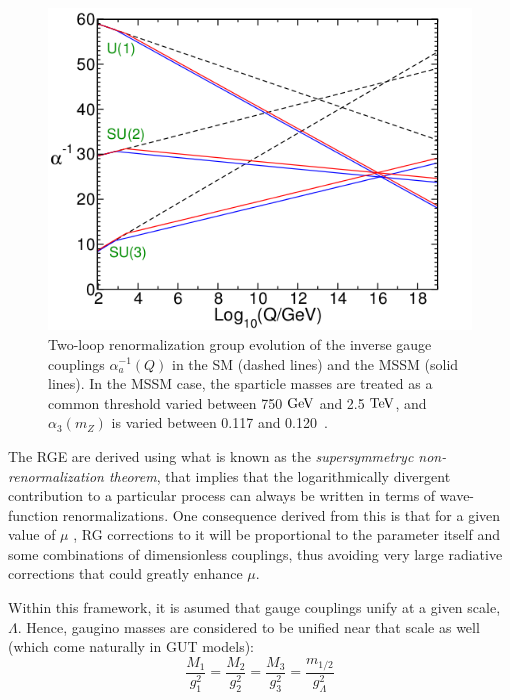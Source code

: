 \begin{figure}[htb!]
\begin{center}
\includegraphics[scale=0.6]{figs/RGE.png}
\end{center}
\caption{Two-loop renormalization group evolution of the inverse gauge couplings $\alpha_a^{-1}(Q)$ in the SM (dashed lines) and the MSSM (solid lines). In the MSSM case, the sparticle masses are treated as a common threshold varied between 750 $\rm GeV$ and 2.5 $\rm TeV$, and $\alpha_3(m_Z)$ is varied between 0.117 and 0.120~\cite{Martin:1997ns}.}
\label{fig:RGE}
\end{figure}

The RGE are derived using what is known as the \textit{supersymmetryc non-renormalization theorem}, that implies that the logarithmically divergent contribution to a particular process can always be written in terms of wave-function renormalizations. One consequence derived from this is that for a given value of $\mu$ , RG corrections to it will be proportional to the parameter itself and some combinations of dimensionless couplings, thus avoiding very large radiative corrections that could greatly enhance $\mu$. 

Within this framework, it is asumed that gauge couplings unify at a given scale, $\Lambda$. Hence, gaugino masses are considered to be unified near that scale as well (which come naturally in GUT models):
\begin{equation}
\frac{M_1}{g_1^2} = \frac{M_2}{g_2^2} = \frac{M_3}{g_3^2} = \frac{m_{1/2}}{g_{\Lambda}^2}
\end{equation}

